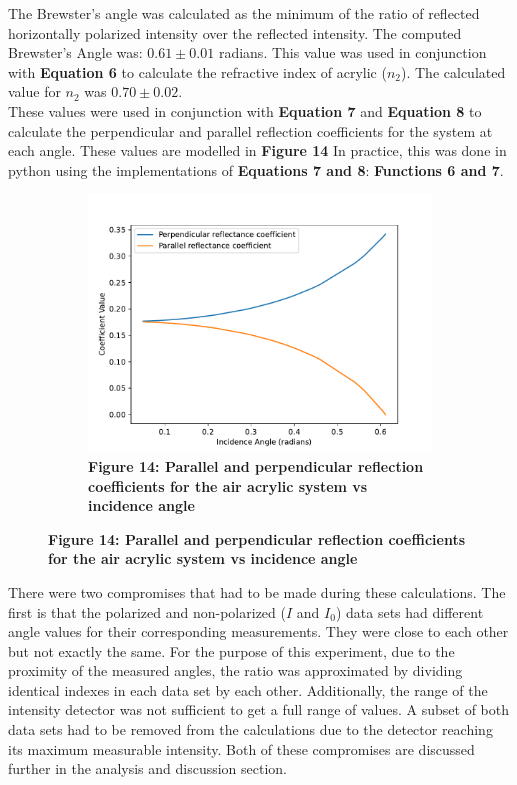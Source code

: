 \documentclass[
	letterpaper, %
	10pt, %
]{CSUniSchoolLabReport}
\begin{document}
The Brewster's angle was calculated as the minimum of the ratio of reflected
horizontally polarized intensity over the reflected intensity. The computed Brewster's Angle was: $0.61\pm0.01$ radians.
This value was used in conjunction with \textbf{Equation 6} to calculate the refractive index of acrylic ($n_2$).
The calculated value for $n_2$ was $0.70\pm0.02$.\\
\newpage
These values were used in conjunction with \textbf{Equation 7} and \textbf{Equation 8} to calculate the perpendicular
and parallel reflection coefficients for the system at each angle. These values are modelled in \textbf{Figure 14}
In practice, this was done in python using the implementations of \textbf{Equations 7 and 8}: \textbf{Functions 6 and 7}.
\begin{figure}[H]
	\centering
	\begin{subfigure}{0.45\textwidth}
		\includegraphics[width=\textwidth]{../figures/figure14.pdf}
		\caption{\textbf{Figure 14: Parallel and perpendicular reflection coefficients for the air acrylic system vs incidence angle}}
	\end{subfigure}
\end{figure}
There were two compromises that had to be made during these calculations. The first is
that the polarized and non-polarized ($I$ and $I_0$) data sets had different angle values
for their corresponding measurements. They were close to each other but not exactly the same.
For the purpose of this experiment, due to the proximity of the measured angles, the ratio
was approximated by dividing identical indexes in each data set by each other. Additionally,
the range of the intensity detector was not sufficient to get a full range of values.
A subset of both data sets had to be removed from the calculations due to the detector
reaching its maximum measurable intensity. Both of these compromises are discussed further
in the analysis and discussion section.
\end{document}
